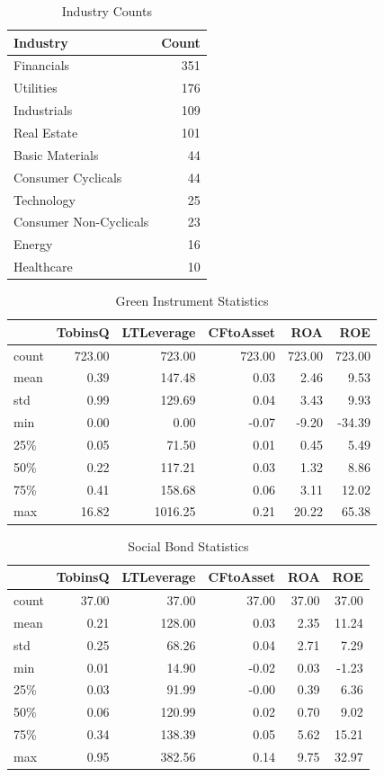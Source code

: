 \documentclass[12pt, a4paper]{article}
\begin{document}
\begin{table}[h]
\centering
\caption{Industry Counts}
\begin{tabular}{lr}
\hline
Industry & Count \\
\hline
Financials & 351 \\
Utilities & 176 \\
Industrials & 109 \\
Real Estate & 101 \\
Basic Materials & 44 \\
Consumer Cyclicals & 44 \\
Technology & 25 \\
Consumer Non-Cyclicals & 23 \\
Energy & 16 \\
Healthcare & 10 \\
\hline
\end{tabular}
\label{table:3}
\end{table}

\begin{table}[h]
\centering
\caption{Green Instrument Statistics}
\begin{tabular}{lrrrrr}
\hline
 & TobinsQ & LTLeverage & CFtoAsset & ROA & ROE \\
\hline
count & 723.00 & 723.00 & 723.00 & 723.00 & 723.00 \\
mean & 0.39 & 147.48 & 0.03 & 2.46 & 9.53 \\
std & 0.99 & 129.69 & 0.04 & 3.43 & 9.93 \\
min & 0.00 & 0.00 & -0.07 & -9.20 & -34.39 \\
25\% & 0.05 & 71.50 & 0.01 & 0.45 & 5.49 \\
50\% & 0.22 & 117.21 & 0.03 & 1.32 & 8.86 \\
75\% & 0.41 & 158.68 & 0.06 & 3.11 & 12.02 \\
max & 16.82 & 1016.25 & 0.21 & 20.22 & 65.38 \\
\hline
\end{tabular}
\label{table:4}
\end{table}

\begin{table}[h]
\centering
\caption{Social Bond Statistics}
\begin{tabular}{lrrrrr}
\hline
 & TobinsQ & LTLeverage & CFtoAsset & ROA & ROE \\
\hline
count & 37.00 & 37.00 & 37.00 & 37.00 & 37.00 \\
mean & 0.21 & 128.00 & 0.03 & 2.35 & 11.24 \\
std & 0.25 & 68.26 & 0.04 & 2.71 & 7.29 \\
min & 0.01 & 14.90 & -0.02 & 0.03 & -1.23 \\
25\% & 0.03 & 91.99 & -0.00 & 0.39 & 6.36 \\
50\% & 0.06 & 120.99 & 0.02 & 0.70 & 9.02 \\
75\% & 0.34 & 138.39 & 0.05 & 5.62 & 15.21 \\
max & 0.95 & 382.56 & 0.14 & 9.75 & 32.97 \\
\hline
\end{tabular}
\label{table:5}
\end{table}
\end{document}

